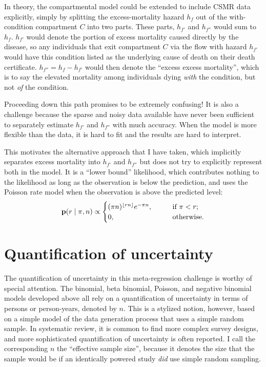 In theory, the compartmental model could be extended to include CSMR
data explicitly, simply by splitting the excess-mortality hazard $h_f$ out
of the with-condition compartment $C$ into two parts.  These parts,
$h_{f'}$ and $h_{f''}$ would sum to $h_f$. $h_{f'}$ would denote the portion of
excess mortality caused directly by the disease, so any individuals
that exit compartment $C$ via the flow with hazard $h_{f'}$ would have this condition
listed as the underlying cause of death on their death certificate.
$h_{f''} = h_{f} - h_{f'}$ would then denote the ``excess excess mortality'',
which is to say the elevated mortality among individuals dying
\emph{with} the condition, but not \emph{of} the condition.

Proceeding down this path promises to be extremely confusing!  It is
also a challenge because the sparse and noisy data available have
never been sufficient to separately estimate $h_{f'}$ and $h_{f''}$ with much
accuracy.  When the model is more flexible than the data, it is hard
to fit and the results are hard to interpret.

This motivates the alternative approach that I have taken, which
implicitly separates excess mortality into $h_{f'}$ and $h_{f''}$ but does
not try to explicitly represent both in the model.  It is a ``lower
bound'' likelihood, which contributes nothing to the likelihood as
long as the observation is below the prediction, and uses the Poisson
rate model when the observation is above the predicted level:
\[
\mathbf{p}(r \;|\; \pi,n) \propto
\begin{cases}
(\pi n)^{\lfloor rn\rfloor} e^{-\pi n}, &\qquad\text{if } \pi < r;\\
  0, &\qquad\text{otherwise.}
\end{cases}
\]

\section{Quantification of uncertainty}
The quantification of uncertainty in this meta-regression challenge is
worthy of special attention.  The binomial, beta binomial, Poisson,
and negative binomial models developed above all rely on a
quantification of uncertainty in terms of persons or person-years,
denoted by $n$.  This is a stylized notion, however, based on a simple
model of the data generation process that uses a simple random sample.
In systematic review, it is common to find more complex survey
designs, and more sophisticated quantification of uncertainty is often
reported.  I call the corresponding $n$ the ``effective sample size'',
because it denotes the size that the sample would be if an identically
powered study \emph{did} use simple random sampling.

